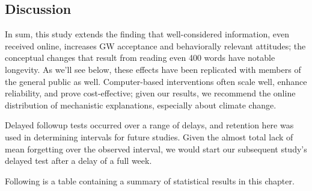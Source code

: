 \subsection{Discussion}

In sum, this study extends the finding that well-considered information, even
received online, increases GW acceptance and behaviorally relevant attitudes;
the conceptual changes that result from reading even 400 words have notable
longevity. As we'll see below, these effects have been replicated with members
of the general public as well. Computer-based interventions often scale well,
enhance reliability, and prove cost-effective; given our results, we recommend
the online distribution of mechanistic explanations, especially about climate
change.  

Delayed followup tests occurred over a range of delays, and retention here was
used in determining intervals for future studies.  Given the almost total lack
of mean forgetting over the observed interval, we would start our subsequent
study's delayed test after a delay of a full week.

Following is a table containing a summary of statistical results in this chapter.

